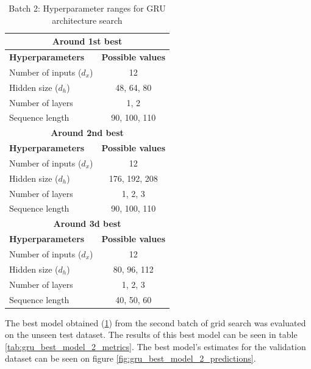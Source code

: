 \FloatBarrier
\begin{table}[h]
    \centering
    \begin{tabular}{|l|c|}
        \hline
        \multicolumn{2}{|c|}{\textbf{Around 1st best}} \\
        \hline
        \textbf{Hyperparameters} & \textbf{Possible values} \\
        \hline
        Number of inputs ($d_x$) & 12 \\
        \hline
        Hidden size ($d_h$) & 48, 64, 80 \\
        \hline
        Number of layers & 1, 2 \\
        \hline
        Sequence length & 90, 100, 110 \\
        \hline \hline
        \multicolumn{2}{|c|}{\textbf{Around 2nd best}} \\
        \hline
        \textbf{Hyperparameters} & \textbf{Possible values} \\
        \hline
        Number of inputs ($d_x$) & 12 \\
        \hline
        Hidden size ($d_h$) & 176, 192, 208 \\
        \hline
        Number of layers & 1, 2, 3 \\
        \hline
        Sequence length & 90, 100, 110 \\
        \hline \hline
        \multicolumn{2}{|c|}{\textbf{Around 3d best}} \\
        \hline
        \textbf{Hyperparameters} & \textbf{Possible values} \\
        \hline
        Number of inputs ($d_x$) & 12 \\
        \hline
        Hidden size ($d_h$) & 80, 96, 112 \\
        \hline
        Number of layers & 1, 2, 3 \\
        \hline
        Sequence length & 40, 50, 60 \\
        \hline
    \end{tabular}
    \caption{Batch 2: Hyperparameter ranges for GRU architecture search}
    \label{tab:gru_hyperparams_2}
\end{table}
\FloatBarrier

The best model obtained (\ref{tab:gru_hyperparams_2}) from the second batch of grid search was evaluated on the unseen test dataset. The results of this best model can be seen in table \ref{tab:gru_best_model_2_metrics}. The best model's estimates for the validation dataset can be seen on figure \ref{fig:gru_best_model_2_predictions}.

